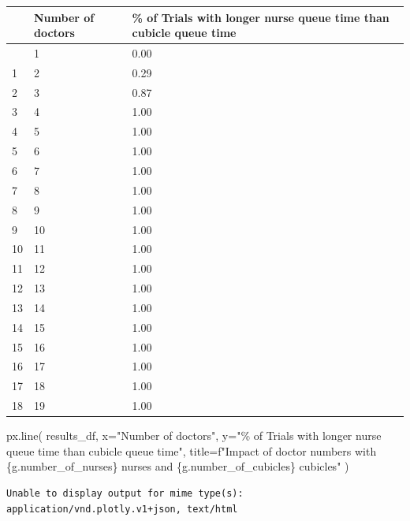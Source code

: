 \documentclass[
  letterpaper,
  DIV=11,
  numbers=noendperiod]{scrreprt}
\newenvironment{Shaded}{}{}
\newcommand{\NormalTok}[1]{\textcolor[rgb]{0.14,0.16,0.18}{#1}}
\newcommand{\OperatorTok}[1]{\textcolor[rgb]{0.14,0.16,0.18}{#1}}
\newcommand{\SpecialCharTok}[1]{\textcolor[rgb]{0.00,0.36,0.77}{#1}}
\newcommand{\SpecialStringTok}[1]{\textcolor[rgb]{0.01,0.18,0.38}{#1}}
\newcommand{\StringTok}[1]{\textcolor[rgb]{0.01,0.18,0.38}{#1}}
\begin{document}
\begin{longtable}[]{@{}lll@{}}
\toprule\noalign{}
& Number of doctors & \% of Trials with longer nurse queue time than
cubicle queue time \\
\midrule\noalign{}
\endhead
\bottomrule\noalign{}
\endlastfoot
0 & 1 & 0.00 \\
1 & 2 & 0.29 \\
2 & 3 & 0.87 \\
3 & 4 & 1.00 \\
4 & 5 & 1.00 \\
5 & 6 & 1.00 \\
6 & 7 & 1.00 \\
7 & 8 & 1.00 \\
8 & 9 & 1.00 \\
9 & 10 & 1.00 \\
10 & 11 & 1.00 \\
11 & 12 & 1.00 \\
12 & 13 & 1.00 \\
13 & 14 & 1.00 \\
14 & 15 & 1.00 \\
15 & 16 & 1.00 \\
16 & 17 & 1.00 \\
17 & 18 & 1.00 \\
18 & 19 & 1.00 \\
\end{longtable}

\begin{Shaded}
\begin{Highlighting}[]
\NormalTok{px.line(}
\NormalTok{  results\_df,}
\NormalTok{  x}\OperatorTok{=}\StringTok{"Number of doctors"}\NormalTok{,}
\NormalTok{  y}\OperatorTok{=}\StringTok{"}\SpecialCharTok{\% o}\StringTok{f Trials with longer nurse queue time than cubicle queue time"}\NormalTok{,}
\NormalTok{  title}\OperatorTok{=}\SpecialStringTok{f"Impact of doctor numbers with }\SpecialCharTok{\{}\NormalTok{g}\SpecialCharTok{.}\NormalTok{number\_of\_nurses}\SpecialCharTok{\}}\SpecialStringTok{ nurses and }\SpecialCharTok{\{}\NormalTok{g}\SpecialCharTok{.}\NormalTok{number\_of\_cubicles}\SpecialCharTok{\}}\SpecialStringTok{ cubicles"}
\NormalTok{  )}
\end{Highlighting}
\end{Shaded}

\begin{verbatim}
Unable to display output for mime type(s): application/vnd.plotly.v1+json, text/html
\end{verbatim}
\end{document}

